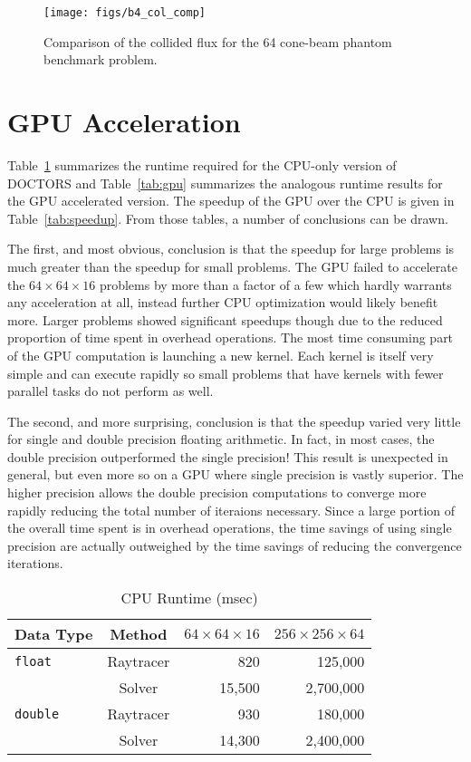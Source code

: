\begin{figure}[tb]
  \begin{center}
   \texttt{[image: figs/b4\_col\_comp]}
  \end{center}
  \caption{Comparison of the collided flux for the 64 cone-beam phantom benchmark problem.}
\label{fig:b4_col_comp}
\end{figure}

\section{GPU Acceleration}

Table~\ref{tab:cpu} summarizes the runtime required for the CPU-only version of DOCTORS and Table~\ref{tab:gpu} summarizes the analogous runtime results for the GPU accelerated version. The speedup of the GPU over the CPU is given in Table~\ref{tab:speedup}. From those tables, a number of conclusions can be drawn.

The first, and most obvious, conclusion is that the speedup for large problems is much greater than the speedup for small problems. The GPU failed to accelerate the $64 \times 64 \times 16$ problems by more than a factor of a few which hardly warrants any acceleration at all, instead further CPU optimization would likely benefit more. Larger problems showed significant speedups though due to the reduced proportion of time spent in overhead operations. The most time consuming part of the GPU computation is launching a new kernel. Each kernel is itself very simple and can execute rapidly so small problems that have kernels with fewer parallel tasks do not perform as well.

The second, and more surprising, conclusion is that the speedup varied very little for single and double precision floating arithmetic. In fact, in most cases, the double precision outperformed the single precision! This result is unexpected in general, but even more so on a GPU where single precision is vastly superior. The higher precision allows the double precision computations to converge more rapidly reducing the total number of iteraions necessary. Since a large portion of the overall time spent is in overhead operations, the time savings of using single precision are actually outweighed by the time  savings of reducing the convergence iterations.

\begin{table}[ht]
\caption{CPU Runtime (msec)}
\centering 
\begin{tabular}{l c r r}
\hline \hline   
Data Type & Method & $64 \times 64 \times 16$ & $256 \times 256 \times 64$\\ [0.5ex] 
\hline
\texttt{float}  & Raytracer & 820   &  125,000 \\
                & Solver    & 15,500  &  2,700,000 \\
\texttt{double} & Raytracer & 930   & 180,000 \\
                & Solver    & 14,300   & 2,400,000 \\  [1ex]
\hline
\end{tabular}
\label{tab:cpu}
\end{table}

